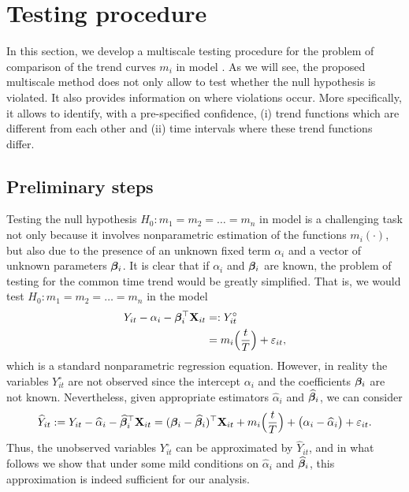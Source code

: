 \documentclass[a4paper,12pt]{article}
\makeatletter
\renewcommand{\eqref}[1]{\tagform@{\ref{#1}}}
\makeatother
\begin{document}
\section{Testing procedure}\label{sec:test}

In this section, we develop a multiscale testing procedure for the problem of comparison of the trend curves $m_i$ in model \eqref{eq:model_full}.  As we will see, the proposed multiscale method does not only allow to test whether the null hypothesis is violated. It also provides information on where violations occur. More specifically, it allows to identify, with a pre-specified confidence, (i) trend functions which are different from each other and (ii) time intervals where these trend functions differ.

\subsection{Preliminary steps}\label{subsec:test:prep}

Testing the null hypothesis $H_0: m_1 = m_2 = \ldots = m_n$ in model \eqref{eq:model_full} is a challenging task not only because it involves nonparametric estimation of the functions $m_i(\cdot)$, but also due to the presence of an unknown fixed term $\alpha_i$ and a vector of unknown parameters $\bm{\beta}_i$. It is clear that if $\alpha_i$ and $\bm{\beta}_i$ are known, the problem of testing for the common time trend would be greatly simplified. That is, we would test $H_0: m_1 = m_2 = \ldots = m_n$ in the model
\begin{align*}
Y_{it} - \alpha_i - \bm{\beta}_i^\top \mathbf{X}_{it} & =: Y_{it}^\circ\\
					& = m_i \Big( \frac{t}{T} \Big) + \varepsilon_{it}, 
\end{align*}
which is a standard nonparametric regression equation. However, in reality the variables $Y_{it}^\circ$ are not observed since the intercept $\alpha_i$ and the coefficients $\bm{\beta}_i$ are not known. Nevertheless, given appropriate estimators $\widehat{\alpha}_i$ and $\widehat{\bm{\beta}}_i$, we can consider
\begin{align*}
	\widehat{Y}_{it} := Y_{it} -\widehat{\alpha}_i - \widehat{\bm{\beta}}_i^\top \mathbf{X}_{it} =(\bm{\beta}_i - \widehat{\bm{\beta}}_i)^\top \mathbf{X}_{it} + m_i \Big( \frac{t}{T} \Big) + \big( \alpha_i - \widehat{\alpha}_i \big) + \varepsilon_{it}. 
\end{align*}
Thus, the unobserved variables $Y_{it}^\circ$ can be approximated by $\widehat{Y}_{it}$, and in what follows we show that under some mild conditions on $\widehat{\alpha}_i$ and $\widehat{\bm{\beta}}_i$, this approximation is indeed sufficient for our analysis. 
\end{document}

